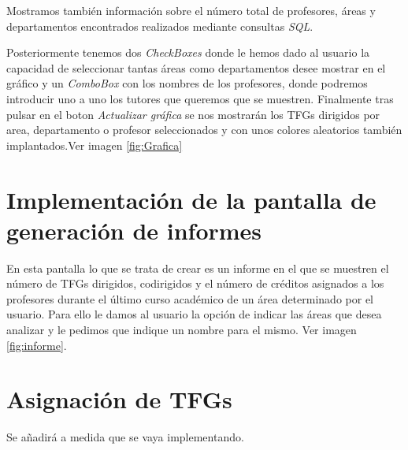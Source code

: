 Mostramos también información sobre el número total de profesores, áreas y departamentos encontrados realizados mediante consultas \emph{SQL}.

Posteriormente tenemos dos \emph{CheckBoxes} donde le hemos dado al usuario la capacidad de seleccionar tantas áreas como departamentos desee mostrar en el gráfico y un \emph{ComboBox} con los nombres de los profesores, donde podremos introducir uno a uno los tutores que queremos que se muestren. Finalmente tras pulsar en el boton \emph{Actualizar gráfica} se nos mostrarán los TFGs dirigidos por area, departamento o profesor seleccionados y con unos colores aleatorios también implantados.Ver imagen \ref{fig:Grafica}


\section{Implementación de la pantalla de generación de informes}

En esta pantalla lo que se trata de crear es un informe en el que se muestren el número de TFGs dirigidos, codirigidos y el número de créditos asignados a los profesores durante el último curso académico de un área determinado por el usuario.
Para ello le damos al usuario la opción de indicar las áreas que desea analizar y le pedimos que indique un nombre para el mismo. Ver imagen \ref{fig:informe}.


\section{Asignación de TFGs}

Se añadirá a medida que se vaya implementando.